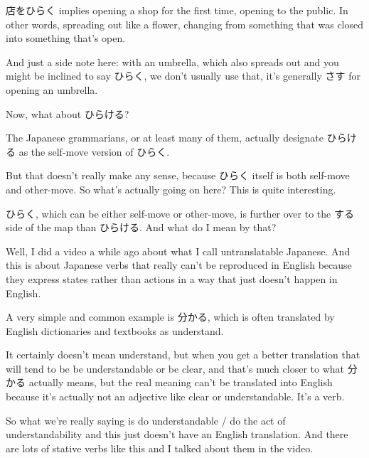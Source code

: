 店をひらく implies opening a shop for the first time, opening to the public. In other words, spreading out like a flower, changing from something that was closed into something that's open.

And just a side note here: with an umbrella, which also spreads out and you might be inclined to say ひらく, we don't usually use that, it's generally さす for opening an umbrella.

{}

\stopsectionlevel

\startsectionlevel[title={開ける},reference={開ける}]

Now, what about ひらける?

The Japanese grammarians, or at least many of them, actually designate ひらける as the self-move version of ひらく.

{}

But that doesn't really make any sense, because ひらく itself is both self-move and other-move. So what's actually going on here? This is quite interesting.

ひらく, which can be either self-move or other-move, is further over to the する side of the map than ひらける. And what do I mean by that?

{}

Well, I did a video a while ago about what I call untranslatable Japanese. And this is about Japanese verbs that really can't be reproduced in English because they express states rather than actions in a way that just doesn't happen in English.

A very simple and common example is 分かる, which is often translated by English dictionaries and textbooks as understand.

{}

It certainly doesn't mean understand, but when you get a better translation that will tend to be be understandable or be clear, and that's much closer to what 分かる actually means, but the real meaning can't be translated into English because it's actually not an adjective like clear or understandable. It's a verb.

So what we're really saying is do understandable / do the act of understandability and this just doesn't have an English translation. And there are lots of stative verbs like this and I talked about them in the video.

